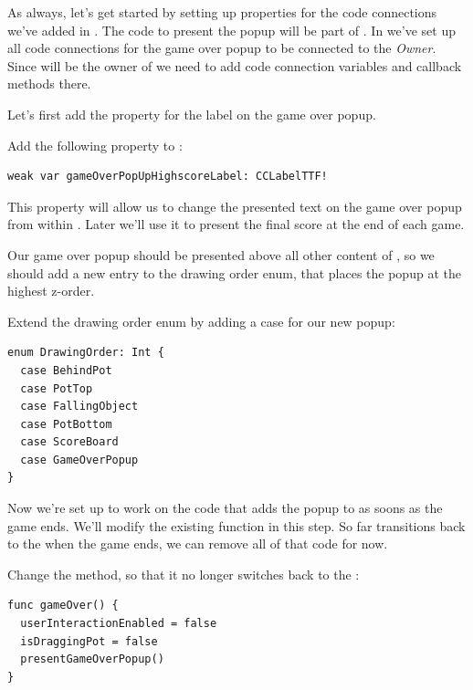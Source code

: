 As always, let's get started by setting up properties for the code connections
we've added in \SB{}. The code to present the popup will be part of 
. In \SB{} we've set up all code connections for the game
over popup to be connected to the \textit{Owner}. Since 
will be the owner of  we need to add code connection
variables and callback methods there.

Let's first add the property for the label on the game over popup.
\begin{leftbar}
Add the following property to :
\begin{lstlisting}
weak var gameOverPopUpHighscoreLabel: CCLabelTTF!
\end{lstlisting}
\end{leftbar}
This property will allow us to change the presented text on the game over popup
from within . Later we'll use it to present the final
score at the end of each game.

Our game over popup should be presented above all other content of
, so we should add a new entry to the drawing order enum,
that places the popup at the highest z-order.

\begin{leftbar}
Extend the drawing order enum by adding a case for our new popup:
\begin{lstlisting}
enum DrawingOrder: Int {
  case BehindPot
  case PotTop
  case FallingObject
  case PotBottom
  case ScoreBoard
  case GameOverPopup
}
\end{lstlisting}
\end{leftbar}

Now we're set up to work on the code that adds the popup to
 as soons as the game ends. We'll modify the existing
 function in this step. So far 
transitions back to the  when the game ends, we can
remove all of that code for now.

\begin{leftbar}
Change the  method, so that it no longer switches back to
the :
\begin{lstlisting}
func gameOver() {
  userInteractionEnabled = false
  isDraggingPot = false
  presentGameOverPopup()
}
\end{lstlisting}
\end{leftbar}

